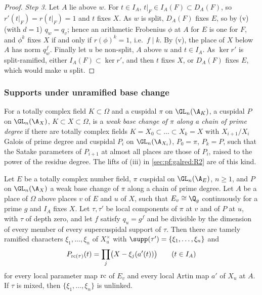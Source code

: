 \begin{proof}
\emph{Step 3.} Let $A$ lie above $w$. For $t\in I_A$, $t|_F\in I_A(F)\subset D_A(F)$, so $r'(t|_F)=r(t|_F)=1$ and $t$ fixes
$X$. As $w$ is split, $D_A(F)$ fixes $E$, so by (v) (with $d=1$) $q_w=q_v$; hence an arithmetic Frobenius $\phi$ at $A$
for $E$ is one for $F$, and $\phi^k$ fixes $X$ if and only if $r(\phi)^k=1$, i.e.\ $f\mid k$. By (v), the place of $X$
below $A$ has norm $q_w^f$. Finally let $u$ be non-split, $A$ above $u$ and $t\in I_A$. As $\ker r'$ is split-ramified,
either $I_A(F)\subset\ker r'$, and then $t$ fixes $X$, or $D_A(F)$ fixes $E$, which would make $u$ split.
\end{proof}

\subsubsection{Supports under unramified base change}

For a totally complex field $K\subset\Omega$ and a cuspidal $\pi$ on $\GL_n(\A_K)$, a cuspidal $P$ on $\GL_n(\A_X)$,
$K\subset X\subset\Omega$, is a \emph{weak base change of $\pi$ along a chain of prime degree} if there are totally
complex fields $K=X_0\subset\dots\subset X_k=X$ with $X_{i+1}/X_i$ Galois of prime degree and cuspidal $P_i$ on
$\GL_n(\A_{X_i})$, $P_0=\pi$, $P_k=P$, such that the Satake parameters of $P_{i+1}$ at almost all places are those of
$P_i$, raised to the power of the residue degree. The lifts of (iii) in \cref{sec:pf:galred:R2} are of this kind.

\begin{theorem}\label{pf:galred:suppbc}
Let $E$ be a totally complex number field, $\pi$ cuspidal on $\GL_n(\A_E)$, $n\ge1$, and $P$ on $\GL_n(\A_X)$ a weak base
change of $\pi$ along a chain of prime degree. Let $A$ be a place of $\Omega$ above places $v$ of $E$ and $u$ of $X$,
such that $E_v\cong\Q_g$ continuously for a prime $g$ and $I_A$ fixes $X$. Let $\tau,\tau'$ be local components of $\pi$
at $v$ and of $P$ at $u$, with $\tau$ of depth zero, and let $f$ satisfy $q_u=g^f$ and be divisible by the dimension of
every member of every supercuspidal support of $\tau$. Then there are tamely ramified characters $\xi_1,\dots,\xi_n$ of
$X_u^\times$ with $\supp(\tau')=\{\xi_1,\dots,\xi_n\}$ and
\[
  P_{\mathrm{rc}(\tau)}(t)=\prod_j\bigl(X-\xi_j(a'(t))\bigr)\qquad(t\in I_A)
\]
for every local parameter map $\mathrm{rc}$ of $E_v$ and every local Artin map $a'$ of $X_u$ at $A$. If $\tau$ is mixed, then
$\{\xi_1,\dots,\xi_n\}$ is unlinked.
\end{theorem}

